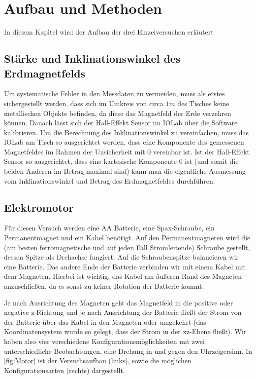 
\section{Aufbau und Methoden}
\label{sec:aufbau}

In diesem Kapitel wird der Aufbau der drei Einzelversuchen erläutert

\subsection{Stärke und Inklinationswinkel des Erdmagnetfelds}
\label{sec:Erdmagnetfeld}
Um systematische Fehler in den Messdaten zu vermeiden, muss als erstes sichergestellt werden, dass sich im Umkreis von circa \( 1 \unit{m} \) des Tisches keine metallischen Objekte befinden, da diese das Magnetfeld der Erde verzehren können. Danach lässt sich der Hall-Effekt Sensor im IOLab über die Software kalibrieren.
Um die Berechnung des Inklinationswinkel zu vereinfachen, muss das IOLab am Tisch so ausgerichtet werden, dass eine Komponente des gemessenen Magnetfeldes im Rahmen der Unsicherheit mit \( 0 \) vereinbar ist. Ist der Hall-Effekt Sensor so ausgerichtet, dass eine kartesische Komponente 0 ist (und somit die beiden Anderen im Betrag maximal sind) kann man die eigentliche Ausmessung vom Inklinationswinkel und Betrag des Erdmagnetfeldes durchführen.

\subsection{Elektromotor} 
Für diesen Versuch werden eine AA Batterie, eine Spax-Schraube, ein Permanentmagnet und ein Kabel benötigt. Auf den Permanentmagneten wird die (am besten ferromagnetische und auf jeden Fall Stromleitende) Schraube gestellt, dessen Spitze als Drehachse fungiert. Auf die Schraubenspitze balancieren wir eine Batterie. Das andere Ende der Batterie verbinden wir mit einem Kabel mit dem Magneten. Hierbei ist wichtig, das Kabel am äußeren Rand des Magneten anzuschließen, da es sonst zu keiner Rotation der Batterie kommt.

Je nach Ausrichtung des Magneten geht das Magnetfeld in die positive oder negative z-Richtung und je nach Ausrichtung der Batterie fließt der Strom von der Batterie über das Kabel in den Magneten oder umgekehrt (das Koordinatensystem wurde so gelegt, dass der Strom in der xz-Ebene fließt). Wir haben also vier verschiedene Konfigurationsmöglichkeiten mit zwei unterschiedliche Beobachtungen, eine Drehung in und gegen den Uhrzeigersinn. In \autoref{fig:Motor} ist der Versuchsaufbau (links), sowie die möglichen Konfigurationsarten (rechts) dargestellt.


